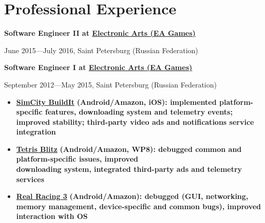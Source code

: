 \section*{Professional Experience}

{
\fontsize{12pt}{12pt}\selectfont
\bfseries Software Engineer II at
\href{http://www.ea.com}{Electronic Arts (EA Games)}
\mdseries
}

{
\fontsize{9pt}{8pt}\selectfont
June 2015---July 2016, Saint Petersburg (Russian Federation)
}


\vspace{0.2cm}

{
\fontsize{12pt}{12pt}\selectfont
\bfseries Software Engineer I at
\href{http://www.ea.com}{Electronic Arts (EA Games)}
\mdseries
}

{
\fontsize{9pt}{8pt}\selectfont
September 2012---May 2015, Saint Petersburg (Russian Federation)
}

\vspace{0.2cm}

\begin{itemize}[rightmargin=\dimexpr\linewidth-18cm-\leftmargin\relax]
\item
    \href{http://www.ea.com/simcity-buildit}
        {\bfseries SimCity BuildIt\mdseries}
        \bfseries (Android/Amazon, iOS)\mdseries:
        implemented platform-specific features,
        downloading system
        and telemetry events;
        improved stability;
        third-party video ads and notifications service integration
\item
    \href{http://www.tetrisblitz.com}
        {\bfseries Tetris Blitz\mdseries}
        \bfseries(Android/Amazon, WP8)\mdseries:
        debugged common and platform-specific issues,
        improved \\ downloading system,
        integrated third-party ads and telemetry services
\item
    \href{http://www.ea.com/real-racing-3}
        {\bfseries Real Racing 3\mdseries}
        \bfseries (Android/Amazon)\mdseries:
        debugged (GUI, networking, memory management, device-specific and common bugs),
        improved interaction with OS
\end{itemize}

